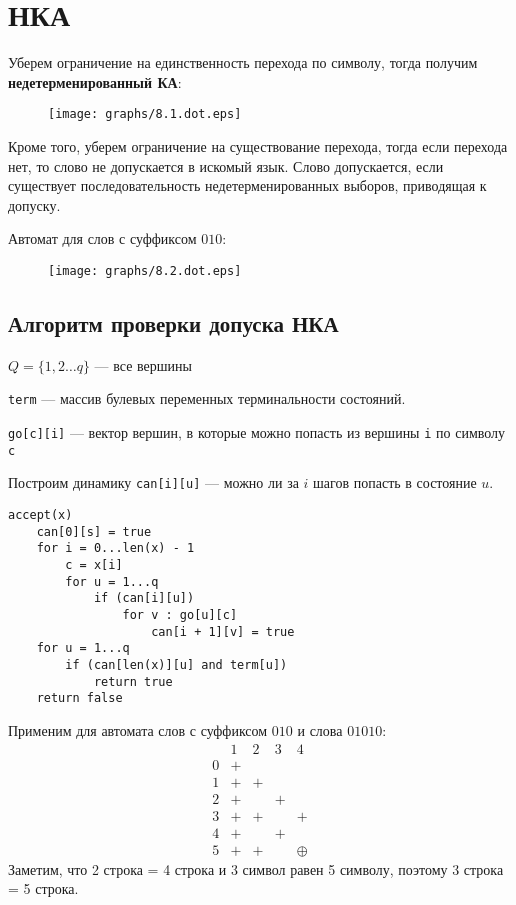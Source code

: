 

\cfoot{}



\section*{НКА}

Уберем ограничение на единственность перехода по символу, тогда получим \textbf{недетерменированный КА}:

\begin{figure}[h]
    \centering
    \texttt{[image: graphs/8.1.dot.eps]}
\end{figure}

Кроме того, уберем ограничение на существование перехода, тогда если перехода нет, то слово не допускается в искомый язык.
Слово допускается, если существует последовательность недетерменированных выборов, приводящая к допуску.

\begin{example}
    Автомат для слов с суффиксом $010$:
    \begin{figure}[h]
        \centering
        \texttt{[image: graphs/8.2.dot.eps]}
    \end{figure}
\end{example}

\subsection*{Алгоритм проверки допуска НКА}

$Q=\{1, 2\ldots q\}$ --- все вершины

\texttt{term} --- массив булевых переменных терминальности состояний.

\texttt{go[c][i]} --- вектор вершин, в которые можно попасть из вершины \texttt{i} по символу \texttt{c}

Построим динамику \texttt{can[i][u]} --- можно ли за $i$ шагов попасть в состояние $u$.

\begin{verbatim}
accept(x)
    can[0][s] = true
    for i = 0...len(x) - 1
        c = x[i]
        for u = 1...q
            if (can[i][u])
                for v : go[u][c]
                    can[i + 1][v] = true
    for u = 1...q
        if (can[len(x)][u] and term[u])
            return true
    return false
\end{verbatim}

Применим для автомата слов с суффиксом $010$ и слова $01010$:
$$\begin{array}{c|cccc}
          & 1 & 2 & 3 & 4      \\
        \hline
        0 & +                  \\
        1 & + & +              \\
        2 & + &   & +          \\
        3 & + & + &   & +      \\
        4 & + &   & +          \\
        5 & + & + &   & \oplus
    \end{array}$$
Заметим, что 2 строка = 4 строка и 3 символ равен 5 символу, поэтому 3 строка = 5 строка.

